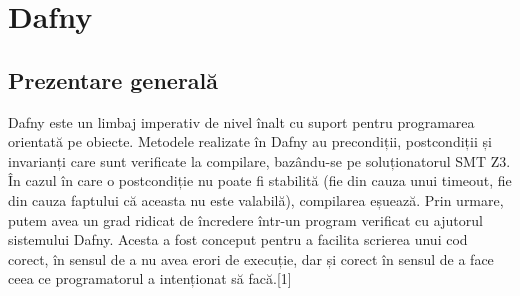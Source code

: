 \chapter{Dafny}
\section{Prezentare generală}

Dafny este un limbaj imperativ de nivel înalt cu suport pentru programarea orientată pe obiecte. Metodele realizate în Dafny
au precondiții, postcondiții și invarianți care sunt verificate la compilare, bazându-se pe soluționatorul SMT Z3. În cazul în care o postcondiție nu poate fi stabilită (fie din cauza unui timeout, fie din cauza faptului că aceasta nu este valabilă), compilarea eșuează. Prin urmare, putem avea un grad ridicat de încredere într-un program verificat cu ajutorul sistemului Dafny.
Acesta a fost conceput pentru a facilita scrierea unui cod corect, în sensul de a nu avea erori de execuție, dar și corect în sensul de a face ceea ce programatorul a intenționat să facă.[1]
